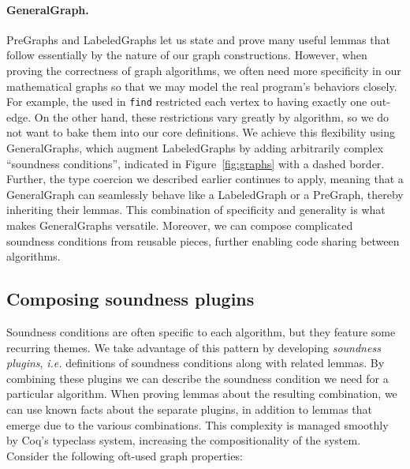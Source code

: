 
\vspace{-0.75ex}
\paragraph{GeneralGraph.}
PreGraphs and LabeledGraphs let us state
and prove many useful lemmas that follow essentially by the nature
of our graph constructions. However, when proving the correctness of graph
algorithms, we often need more specificity in our mathematical graphs
so that we may model the real program's behaviors closely.
For example, the  used in \texttt{find}
restricted each vertex to having exactly one out-edge.
On the other hand, these restrictions vary greatly by algorithm, so we do not
want to bake them into our core definitions.
We achieve this flexibility using GeneralGraphs, which augment
LabeledGraphs by adding arbitrarily complex ``soundness conditions'', indicated in
Figure~\ref{fig:graphs} with a dashed border.
Further, the type coercion we described earlier continues to apply,
meaning that a GeneralGraph can seamlessly behave like a
LabeledGraph or a PreGraph, thereby inheriting their lemmas.
This combination of specificity and generality is
what makes GeneralGraphs versatile. Moreover, we can 
compose complicated soundness conditions from reusable pieces,
further enabling code sharing between algorithms.





\subsection{Composing soundness plugins}
\label{subsec:graphplugins}

Soundness conditions are often specific %
to each algorithm, but they feature some recurring themes.
We take advantage of this pattern by developing %
\emph{soundness plugins}, \emph{i.e.} definitions of soundness
conditions along with related lemmas.  By combining these plugins
we can describe the soundness condition we need for a particular
algorithm.  When proving lemmas about the resulting combination, 
we can use known facts about the separate plugins, in addition to 
lemmas that emerge due to the various combinations.  This complexity
is managed smoothly by Coq's typeclass system, increasing the 
compositionality of the system.
Consider the following oft-used graph properties:

